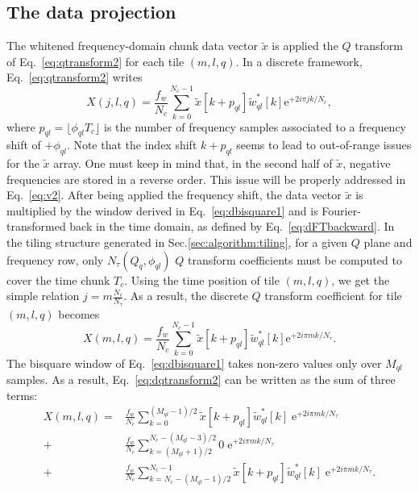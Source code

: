 \subsection{The data projection} \label{sec:algorithm:projection}

The whitened frequency-domain chunk data vector $\tilde{x}$ is applied the $Q$ transform of Eq.~\ref{eq:qtransform2} for each tile $(m, l, q)$. In a discrete framework, Eq.~\ref{eq:qtransform2} writes
\begin{equation}
  X(j,l,q)=\frac{f_w}{N_c}\sum_{k=0}^{N_c-1}{\tilde{x}[k+p_{ql}]\tilde{w}_{ql}^*[k]\mathrm{e}^{+2i\pi jk/N_c}},
  \label{eq:dqtransform1}
\end{equation}
where $p_{ql}=\lfloor \phi_{ql}T_c \rfloor$ is the number of frequency samples associated to a frequency shift of $+\phi_{ql}$. Note that the index shift $k+p_{ql}$ seems to lead to out-of-range issues for the $\tilde{x}$ array. One must keep in mind that, in the second half of $\tilde{x}$, negative frequencies are stored in a reverse order. This issue will be properly addressed in Eq.~\ref{eq:v2}. After being applied the frequency shift, the data vector $\tilde{x}$ is multiplied by the window derived in Eq.~\ref{eq:dbisquare1} and is Fourier-transformed back in the time domain, as defined by Eq.~\ref{eq:dFTbackward}. In the tiling structure generated in Sec.\ref{sec:algorithm:tiling}, for a given $Q$ plane and frequency row, only $N_\tau(Q_q, \phi_{ql})$ $Q$ transform coefficients must be computed to cover the time chunk $T_c$. Using the time position of tile $(m,l,q)$, we get the simple relation $j=m\frac{N_c}{N_\tau}$. As a result, the discrete $Q$ transform coefficient for tile $(m,l,q)$ becomes
\begin{equation}
  X(m, l, q) = \frac{f_w}{N_c}\sum_{k=0}^{N_c-1}{\tilde{x}[k+p_{ql}]\tilde{w}_{ql}^*[k]\mathrm{e}^{+2i\pi mk/N_\tau}}.
  \label{eq:dqtransform2}
\end{equation}
The bisquare window of Eq.~\ref{eq:dbisquare1} takes non-zero values only over $M_{ql}$ samples. As a result, Eq.~\ref{eq:dqtransform2} can be written as the sum of three terms:
\begin{align}
  X(m, l, q)
  = & \frac{f_w}{N_c} \sum_{k=0}^{(M_{ql}-1)/2}{\tilde{x}[k+p_{ql}]\tilde{w}_{ql}^*[k] \; \mathrm{e}^{+2i\pi mk/N_\tau}} \\
  + & \frac{f_w}{N_c} \sum_{k=(M_{ql}+1)/2}^{N_c-(M_{ql}-3)/2}{0 \; \mathrm{e}^{+2i\pi mk/N_\tau}} \\
  + & \frac{f_w}{N_c} \sum_{k=N_c-(M_{ql}-1)/2}^{N_c-1}{\tilde{x}[k+p_{ql}]\tilde{w}_{ql}^*[k] \; \mathrm{e}^{+2i\pi mk/N_\tau}} .
  \label{eq:dqtransform3}
\end{align}
